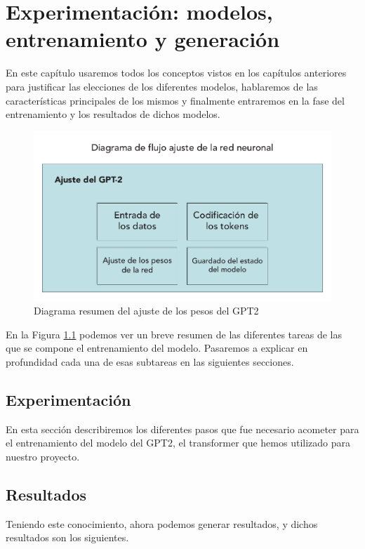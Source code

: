 \chapter{Experimentación: modelos, \\entrenamiento y generación}

En este capítulo usaremos todos los conceptos vistos en los capítulos anteriores para justificar las elecciones de los diferentes modelos, hablaremos de las características principales de los mismos y finalmente entraremos en la fase del entrenamiento y los resultados de dichos modelos.










\begin{figure}[h]
	\centering
	\includegraphics[width=.9\textwidth]{media/gpt-fine-tune.pdf}
	\caption{Diagrama resumen del ajuste de los pesos del GPT2}
	\label{fig:fine-tune-gpt}
\end{figure}

En la Figura \ref{fig:fine-tune-gpt} podemos ver un breve resumen de las diferentes tareas de las que se compone el entrenamiento del modelo. Pasaremos a explicar en profundidad cada una de esas subtareas en las siguientes secciones.


\section{Experimentación}
En esta sección describiremos los diferentes pasos que fue necesario acometer para el entrenamiento del modelo del GPT2, el transformer que hemos utilizado para nuestro proyecto.




\section{Resultados}
Teniendo este conocimiento, ahora podemos generar resultados, y dichos resultados son los siguientes.

